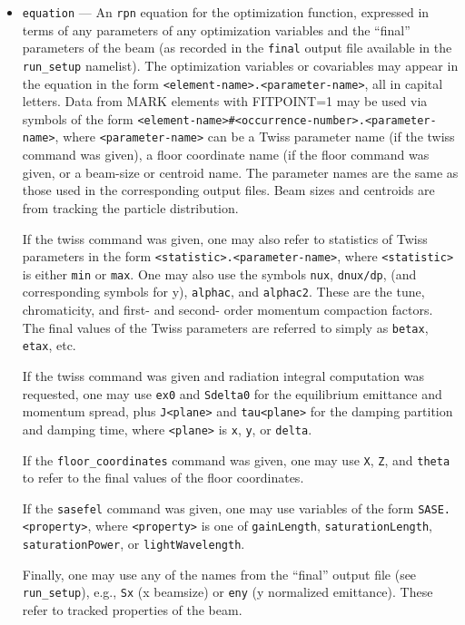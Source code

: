 \documentclass[11pt]{article}
\begin{document}
\begin{itemize}
\item \verb|equation| --- An {\tt rpn} equation for the optimization
function, expressed in terms of any parameters of any optimization
variables and the ``final'' parameters of the beam (as recorded in the
\verb|final| output file available in the \verb|run_setup| namelist).
The optimization variables or covariables may appear in the equation
in the form \verb|<element-name>.<parameter-name>|, all in capital
letters.  Data from MARK elements with FITPOINT=1 may be used via
symbols of the form
\verb|<element-name>#<occurrence-number>.<parameter-name>|, where
\verb|<parameter-name>| can be a Twiss parameter name (if the twiss
command was given), a floor coordinate name (if the floor command was
given, or a beam-size or centroid name.  The parameter names are the
same as those used in the corresponding output files.  Beam sizes
and centroids are from tracking the particle distribution.

If the twiss command was given, one may also refer to statistics of
Twiss parameters in the form \verb|<statistic>.<parameter-name>|,
where \verb|<statistic>| is either \verb|min| or \verb|max|.  One may
also use the symbols \verb|nux|, \verb|dnux/dp|, (and corresponding
symbols for y), \verb|alphac|, and \verb|alphac2|.  These are the
tune, chromaticity, and first- and second- order momentum compaction
factors.  The final values of the Twiss parameters are referred to
simply as \verb|betax|, \verb|etax|, etc.

If the twiss command was given and radiation integral computation
was requested, one may use \verb|ex0| and \verb|Sdelta0| for
the equilibrium emittance and momentum spread, plus \verb|J<plane>|
and \verb|tau<plane>| for the damping partition and damping time,
where \verb|<plane>| is \verb|x|, \verb|y|, or \verb|delta|.

If the \verb|floor_coordinates| command was given, one may use
\verb|X|, \verb|Z|, and \verb|theta| to refer to the final values of
the floor coordinates.

If the \verb|sasefel| command was given, one may use variables of
the form \verb|SASE.<property>|, where \verb|<property>| is one
of \verb|gainLength|, \verb|saturationLength|, 
\verb|saturationPower|, or \verb|lightWavelength|.

Finally, one may use any of the names from the ``final'' output file
(see \verb|run_setup|), e.g., \verb|Sx| (x beamsize) or \verb|eny| (y
normalized emittance).  These refer to tracked properties of the beam.


\end{itemize}
\end{document}
